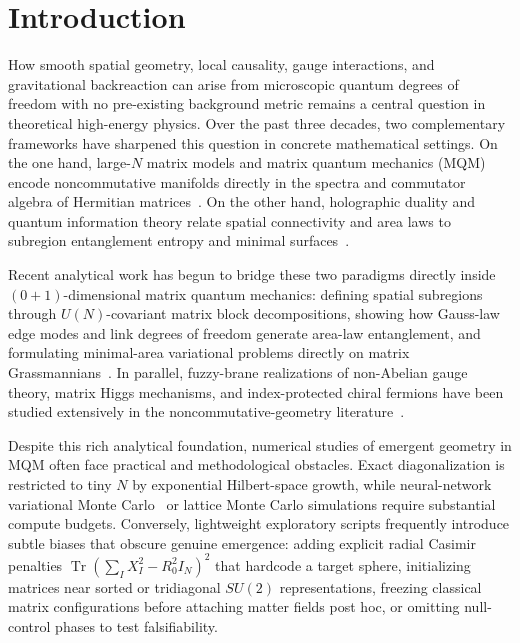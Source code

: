 \documentclass[11pt,a4paper]{article}
\DeclareMathOperator{\Tr}{Tr}
\begin{document}
\section{Introduction}
\label{sec:intro}

How smooth spatial geometry, local causality, gauge interactions, and gravitational backreaction can arise from microscopic quantum degrees of freedom with no pre-existing background metric remains a central question in theoretical high-energy physics. Over the past three decades, two complementary frameworks have sharpened this question in concrete mathematical settings. On the one hand, large-$N$ matrix models and matrix quantum mechanics (MQM) encode noncommutative manifolds directly in the spectra and commutator algebra of Hermitian matrices~\cite{Banks1997,Ishibashi1997,Madore1992,Myers1999,Steinacker2024}. On the other hand, holographic duality and quantum information theory relate spatial connectivity and area laws to subregion entanglement entropy and minimal surfaces~\cite{Ryu2006,Han2020,Gautam2022,Gautam2025,Frenkel2024,Fliss2025}.

Recent analytical work has begun to bridge these two paradigms directly inside $(0+1)$-dimensional matrix quantum mechanics: defining spatial subregions through $U(N)$-covariant matrix block decompositions, showing how Gauss-law edge modes and link degrees of freedom generate area-law entanglement, and formulating minimal-area variational problems directly on matrix Grassmannians~\cite{Han2020,Frenkel2024,Fliss2025,Gautam2025}. In parallel, fuzzy-brane realizations of non-Abelian gauge theory, matrix Higgs mechanisms, and index-protected chiral fermions have been studied extensively in the noncommutative-geometry literature~\cite{Grosse1996,CarowWatamura1997,Iso2001,Chatzistavrakidis2011,Steinacker2024}.

Despite this rich analytical foundation, numerical studies of emergent geometry in MQM often face practical and methodological obstacles. Exact diagonalization is restricted to tiny $N$ by exponential Hilbert-space growth, while neural-network variational Monte Carlo~\cite{Han2020} or lattice Monte Carlo simulations require substantial compute budgets. Conversely, lightweight exploratory scripts frequently introduce subtle biases that obscure genuine emergence: adding explicit radial Casimir penalties $\Tr(\sum_I X_I^2 - R_0^2 I_N)^2$ that hardcode a target sphere, initializing matrices near sorted or tridiagonal $SU(2)$ representations, freezing classical matrix configurations before attaching matter fields post hoc, or omitting null-control phases to test falsifiability.
\end{document}
